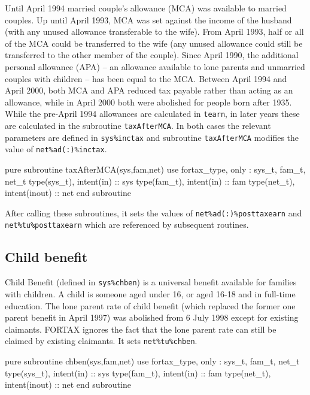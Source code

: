\documentclass[11pt,thmsa,letter,ukenglish]{article}
\begin{document}
\noindent Until April 1994 married couple's allowance (MCA) was available to married couples. Up until April 1993, MCA was set against the income of the husband (with any unused allowance transferable to the wife). From April 1993, half or all of the MCA could be transferred to the wife (any unused allowance could still be transferred to the other member of the couple). Since April 1990, the additional personal allowance (APA) -- an allowance available to lone parents and unmarried couples with children -- has been equal to the MCA. Between April 1994 and April 2000, both MCA and APA reduced tax payable rather than acting as an allowance, while in April 2000 both were abolished for people born after 1935. While the pre-April 1994 allowances are calculated in \texttt{tearn}, in later years these are calculated in the subroutine \texttt{taxAfterMCA}. In both cases the relevant parameters are defined in \texttt{sys\%inctax} and subroutine \texttt{taxAfterMCA} modifies the value of \texttt{net\%ad(:)\%inctax}.

\begin{fortrancode}
pure subroutine taxAfterMCA(sys,fam,net)
    use fortax_type, only : sys_t, fam_t, net_t
    type(sys_t), intent(in)    :: sys
    type(fam_t), intent(in)    :: fam
    type(net_t), intent(inout) :: net
end subroutine
\end{fortrancode}

\noindent After calling these subroutines, it sets the values of \texttt{net\%ad(:)\%posttaxearn} and \texttt{net\%tu\%posttaxearn} which are referenced by subsequent routines.

\subsection{Child benefit}
Child Benefit (defined in \texttt{sys\%chben}) is a universal benefit available for families with children. A child is someone aged under 16, or aged 16-18 and in full-time education. The lone parent rate of child benefit (which replaced the former one parent benefit in April 1997) was abolished from 6 July 1998 except for existing claimants. FORTAX ignores the fact that the lone parent rate can still be claimed by existing claimants. It sets \texttt{net\%tu\%chben}.

\begin{fortrancode}
pure subroutine chben(sys,fam,net)
    use fortax_type, only : sys_t, fam_t, net_t
    type(sys_t), intent(in)    :: sys
    type(fam_t), intent(in)    :: fam
    type(net_t), intent(inout) :: net
end subroutine
\end{fortrancode}
\end{document}
